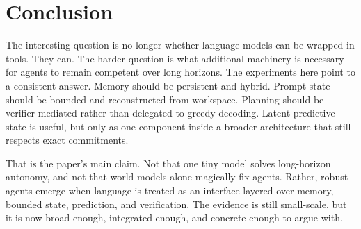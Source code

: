 \documentclass[11pt]{article}
\begin{document}
\section{Conclusion}
The interesting question is no longer whether language models can be wrapped in tools. They can. The harder question is what additional machinery is necessary for agents to remain competent over long horizons. The experiments here point to a consistent answer. Memory should be persistent and hybrid. Prompt state should be bounded and reconstructed from workspace. Planning should be verifier-mediated rather than delegated to greedy decoding. Latent predictive state is useful, but only as one component inside a broader architecture that still respects exact commitments.

That is the paper's main claim. Not that one tiny model solves long-horizon autonomy, and not that world models alone magically fix agents. Rather, robust agents emerge when language is treated as an interface layered over memory, bounded state, prediction, and verification. The evidence is still small-scale, but it is now broad enough, integrated enough, and concrete enough to argue with.



\end{document}
